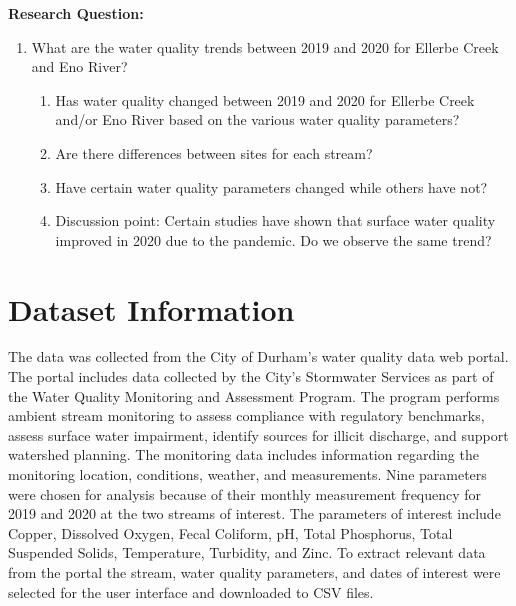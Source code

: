 \documentclass[
  12pt,
]{article}
\providecommand{\tightlist}{%
  \setlength{\itemsep}{0pt}\setlength{\parskip}{0pt}}
\begin{document}
\textbf{Research Question:}

\begin{enumerate}
\def\labelenumi{\arabic{enumi}.}
\tightlist
\item
  What are the water quality trends between 2019 and 2020 for Ellerbe
  Creek and Eno River?

  \begin{enumerate}
  \def\labelenumii{\alph{enumii}.}
  \tightlist
  \item
    Has water quality changed between 2019 and 2020 for Ellerbe Creek
    and/or Eno River based on the various water quality parameters?
  \item
    Are there differences between sites for each stream?
  \item
    Have certain water quality parameters changed while others have not?
  \item
    Discussion point: Certain studies have shown that surface water
    quality improved in 2020 due to the pandemic. Do we observe the same
    trend?
  \end{enumerate}
\end{enumerate}

\newpage

\hypertarget{dataset-information}{%
\section{Dataset Information}\label{dataset-information}}

The data was collected from the City of Durham's water quality data web
portal. The portal includes data collected by the City's Stormwater
Services as part of the Water Quality Monitoring and Assessment Program.
The program performs ambient stream monitoring to assess compliance with
regulatory benchmarks, assess surface water impairment, identify sources
for illicit discharge, and support watershed planning. The monitoring
data includes information regarding the monitoring location, conditions,
weather, and measurements. Nine parameters were chosen for analysis
because of their monthly measurement frequency for 2019 and 2020 at the
two streams of interest. The parameters of interest include Copper,
Dissolved Oxygen, Fecal Coliform, pH, Total Phosphorus, Total Suspended
Solids, Temperature, Turbidity, and Zinc. To extract relevant data from
the portal the stream, water quality parameters, and dates of interest
were selected for the user interface and downloaded to CSV files.
\end{document}
